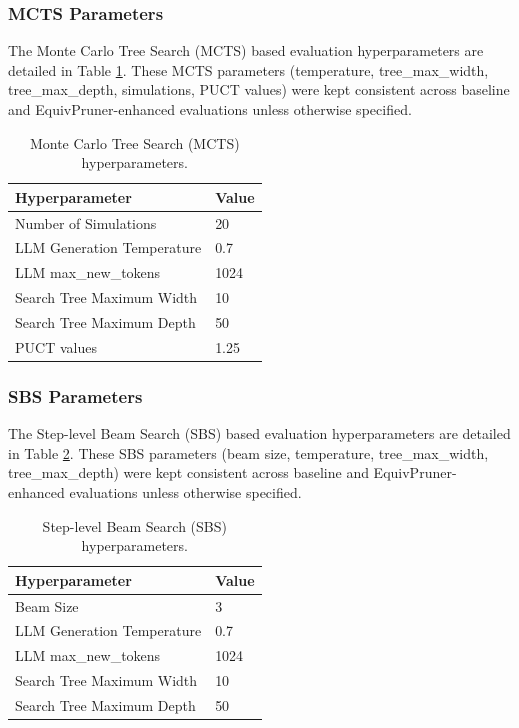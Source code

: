 \documentclass[11pt]{article}
\begin{document}
\subsubsection{MCTS Parameters}
\label{subapp:MCTS_Parameters}
The Monte Carlo Tree Search (MCTS) based evaluation hyperparameters are detailed in Table \ref{tab:mcts_hyperparams}.
These MCTS parameters (temperature, tree\_max\_width, tree\_max\_depth, simulations, PUCT values) were kept consistent across baseline and EquivPruner-enhanced evaluations unless otherwise specified.
\begin{table}[ht]
\centering
\caption{Monte Carlo Tree Search (MCTS) hyperparameters.}
\label{tab:mcts_hyperparams}
\begin{tabular}{ll}
\hline
\textbf{Hyperparameter}                                 & \textbf{Value} \\ \hline
Number of Simulations                                   & 20             \\
LLM Generation Temperature                              & 0.7            \\
LLM max\_new\_tokens         & 1024           \\
Search Tree Maximum Width                               & 10             \\
Search Tree Maximum Depth                               & 50             \\
PUCT values & 1.25           \\ \hline
\end{tabular}
\end{table}

\subsubsection{SBS Parameters}
\label{subapp:SBS_Parameters}
The Step-level Beam Search (SBS) based evaluation hyperparameters are detailed in Table \ref{tab:sbs_hyperparams}.
These SBS parameters (beam size, temperature, tree\_max\_width, tree\_max\_depth) were kept consistent across baseline and EquivPruner-enhanced evaluations unless otherwise specified.
\begin{table}[ht]
\centering
\caption{Step-level Beam Search (SBS) hyperparameters.}
\label{tab:sbs_hyperparams}
\begin{tabular}{ll}
\hline
\textbf{Hyperparameter}                                 & \textbf{Value} \\ \hline
Beam Size                                   & 3             \\
LLM Generation Temperature                              & 0.7            \\
LLM max\_new\_tokens         & 1024           \\
Search Tree Maximum Width                               & 10             \\
Search Tree Maximum Depth                               & 50             \\ \hline
\end{tabular}
\end{table}
\end{document}
